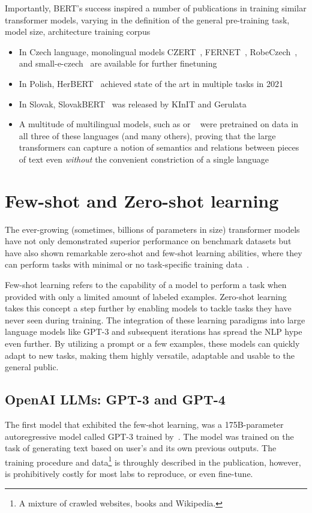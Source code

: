 Importantly, BERT's success inspired a number of publications in training similar transformer models, varying in the definition of the general pre-training task, model size, architecture training corpus

\begin{itemize}
    \item In Czech language, monolingual models CZERT~\cite{czert}, FERNET~\cite{fernet}, RobeCzech~\cite{straka2021robeczech}, and small-e-czech~\cite{kocian2021siamese} are available for further finetuning
    \item In Polish, HerBERT~\cite{mroczkowski-etal-2021-herbert} achieved state of the art in multiple tasks in 2021
    \item In Slovak, SlovakBERT~\cite{pikuliak2021slovakbert} was released by KInIT and Gerulata
    \item A multitude of multilingual models, such as \MBERT or \XLM~\cite{xlm-roberta} were pretrained on data in all three of these languages (and many others), proving that the large transformers can capture a notion of semantics and relations between pieces of text even \textit{without} the convenient constriction of a single language 
\end{itemize}

\section{Few-shot and Zero-shot learning}
\label{sec:llms}
The ever-growing (sometimes, billions of parameters in size) transformer models have not only demonstrated superior performance on benchmark datasets but have also shown remarkable zero-shot and few-shot learning abilities, where they can perform tasks with minimal or no task-specific training data~\cite{gpt3}.

Few-shot learning refers to the capability of a model to perform a task when provided with only a limited amount of labeled examples. Zero-shot learning takes this concept a step further by enabling models to tackle tasks they have never seen during training. The integration of these learning paradigms into large language models like GPT-3 and subsequent iterations has spread the NLP hype even further. By utilizing a prompt or a few examples, these models can quickly adapt to new tasks, making them highly versatile, adaptable and usable to the general public.
\subsection{OpenAI LLMs: GPT-3 and GPT-4}
\label{sec:gpt}
The first model that exhibited the few-shot learning, was a 175B-parameter autoregressive model called GPT-3 trained by~\cite{gpt3}. The model was trained on the task of generating text based on user's and its own previous outputs.
The training procedure and data\footnote{A mixture of crawled websites, books and Wikipedia.} is throughly described in the publication, however, is prohibitively costly for most labs to reproduce, or even fine-tune. 

